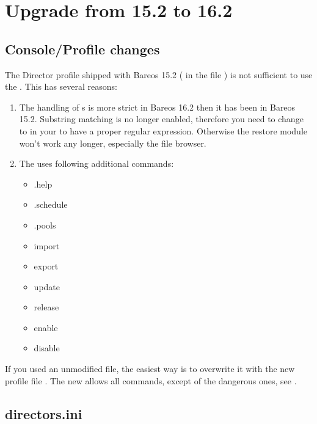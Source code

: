 \section{Upgrade from 15.2 to 16.2}

\subsection{Console/Profile changes}

The \bareosWebui Director profile shipped with Bareos 15.2 ( in the file ) is not sufficient to use the .
This has several reasons:
\begin{enumerate}
  \item The handling of s is more strict in Bareos 16.2 then it has been in Bareos 15.2.
    Substring matching is no longer enabled, therefore you need to change  to 
    in your  to have a proper regular expression.
    Otherwise the restore module won't work any longer, especially the file browser.

  \item The  uses following additional commands:
\begin{itemize}
\item .help
\item .schedule
\item .pools
\item import
\item export
\item update
\item release
\item enable
\item disable
\end{itemize}

\end{enumerate}

If you used an unmodified  file,
the easiest way is to overwrite it with the new profile file .
The new  allows all commands, except of the dangerous ones, see .

\subsection{directors.ini}

